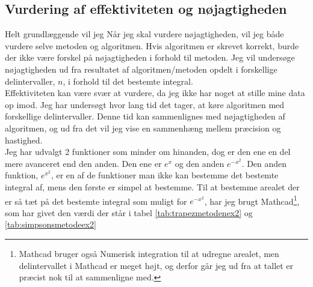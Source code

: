 \documentclass[12pt]{article}
\numberwithin{equation}{section}
\begin{document}
\subsection{Vurdering af effektiviteten og nøjagtigheden}
Helt grundlæggende vil jeg 
Når jeg skal vurdere nøjagtigheden, vil jeg både vurdere selve metoden og algoritmen. Hvis algoritmen er skrevet korrekt, burde der ikke være forskel på nøjagtigheden i forhold til metoden. Jeg vil undersøge nøjagtigheden ud fra resultatet af algoritmen/metoden opdelt i forskellige delintervaller, $n$, i forhold til det bestemte integral.
\\Effektiviteten kan være svær at vurdere, da jeg ikke har noget at stille mine data op imod. Jeg har undersøgt hvor lang tid det tager, at køre algoritmen med forskellige delintervaller. Denne tid kan sammenlignes med nøjagtigheden af algoritmen, og ud fra det vil jeg vise en sammenhæng mellem præcision og hastighed.\\
Jeg har udvalgt 2 funktioner som minder om hinanden, dog er den ene en del mere avanceret end den anden. Den ene er $e^x$ og den anden $e^{-x^2}$. Den anden funktion, $e^{x^2}$, er en af de funktioner man ikke kan bestemme det bestemte integral af, mens den første er simpel at bestemme. Til at bestemme arealet der er så tæt på det bestemte integral som muligt for $e^{-x^2}$, har jeg brugt Mathcad\footnote{Mathcad bruger også Numerisk integration til at udregne arealet, men delintervallet i Mathcad er meget højt, og derfor går jeg ud fra at tallet er præcist nok til at sammenligne med.}, som har givet den værdi der står i tabel \ref{tab:trapezmetodenex2} og \ref{tab:simpsonsmetodeex2}
\end{document}
